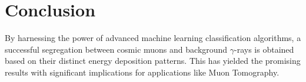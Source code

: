 \documentclass[twocolumn,amsmath,amssymb]{snp}
\begin{document}
\section*{Conclusion}
By harnessing the power of advanced machine learning classification algorithms, a successful segregation between cosmic muons and background $\gamma$-rays is obtained based on their distinct energy deposition patterns. This has yielded the promising results with significant implications for applications like Muon Tomography. \\

\end{document}
